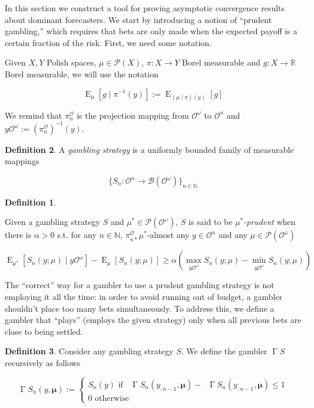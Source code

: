 \documentclass[11pt]{article}
\theoremstyle{definition}
\newtheorem{definition}{Definition}%
\theoremstyle{plain}
\newcommand{\Nats}{\mathbb{N}}
\newcommand{\Reals}{\mathbb{R}}
\newcommand{\Sq}[2]{\{#1\}_{#2 \in \Nats}}
\newcommand{\Sqn}[1]{\Sq{#1}{n}}
\DeclareMathOperator{\E}{E}
\newcommand{\PM}{\mathcal{P}}
\newcommand{\Ob}{\mathcal{O}}
\newcommand{\OO}{\Ob^\omega}
\newcommand{\PO}{\pi^\Ob}
\newcommand{\PMO}{\PM(\OO)}
\newcommand{\Gm}{\mathcal{B}}
\newcommand{\GMO}{\Gm(\OO)}
\DeclareMathOperator{\SVM}{\Sigma V_{\min}}
\DeclareMathOperator{\SVX}{\Sigma V_{\max}}
\DeclareMathOperator{\PG}{\Gamma}
\newcommand{\BM}{\bm{\mu}}
\begin{document}
In this section we construct a tool for proving asymptotic convergence results about dominant forecasters. We start by introducing a notion of \enquote{prudent gambling,} which requires that bets are only made when the expected payoff is a certain fraction of the risk. First, we need some notation.

Given $X,Y$ Polish spaces, $\mu \in \PM(X)$, $\pi: X \rightarrow Y$ Borel measurable and $g: X \rightarrow \Reals$ Borel measurable, we will use the notation 

\begin{equation}
\E_{\mu}\left[g \mid \pi^{-1}\left(y\right)\right]:=\E_{\left(\mu \mid \pi\right)\left(y\right)}\left[g\right]
\end{equation}

We remind that $\PO_n$ is the projection mapping from $\OO$ to $\Ob^n$ and $y\OO:= \left(\PO_{n}\right)^{-1}\left(y\right)$.

\begin{definition}

A \emph{gambling strategy} is a uniformly bounded family of measurable mappings

\[\Sqn{S_n: \Ob^n \rightarrow \GMO}\]

\begin{definition}
\label{def:prudent}

Given a gambling strategy $S$ and $\mu^* \in \PMO$, $S$ is said to be \emph{$\mu^*$-prudent} when there is $\alpha > 0$ s.t. for any $n \in \Nats$, $\PO_{n*} \mu^*$-almost any $y \in \Ob^n$ and any $\mu \in \PMO$

\begin{equation}
\E_{\mu^*}\left[S_n\left(y; \mu\right) \mid y\OO\right] - \E_\mu\left[S_n\left(y; \mu\right)\right] \geq \alpha \left(\max_{y\OO}{S_n\left(y; \mu\right)} - \min_{y\OO}{S_n\left(y; \mu\right)}\right)
\end{equation}

\end{definition}

\end{definition}

The \enquote{correct} way for a gambler to use a prudent gambling strategy is not employing it all the time: in order to avoid running out of budget, a gambler shouldn’t place too many bets simultaneously. To address this, we define a gambler that \enquote{plays} (employs the given strategy) only when all previous bets are close to being settled.

\begin{definition}

Consider any gambling strategy $S$. We define the gambler $\PG{S}$ recursively as follows

\begin{equation}
\PG{S}_n\left(y,\BM\right):=\begin{cases} S_n\left(y\right) \text{ if } {\SVX{\PG{S}}_n\left(y_{:n-1},\BM\right)}-{\SVM{\PG{S}}_n\left(y_{:n-1},\BM\right)} \leq 1 \\ 0 \text{ otherwise} \end{cases}
\end{equation}

\end{definition}
\end{document}
